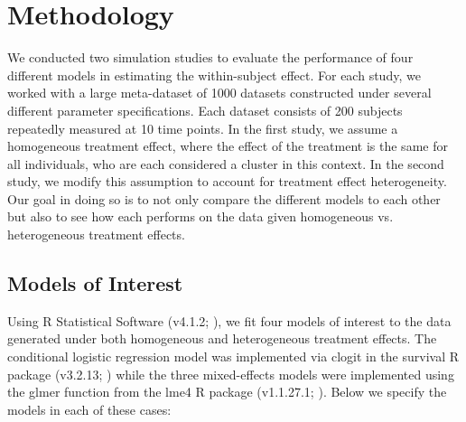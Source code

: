 \documentclass{article}
\begin{document}
    
\section{Methodology}
    We conducted two simulation studies to evaluate the performance of four different models in estimating the within-subject effect. For each study, we worked with a large meta-dataset of 1000 datasets constructed under several different parameter specifications. Each dataset consists of 200 subjects repeatedly measured at 10 time points. In the first study, we assume a homogeneous treatment effect, where the effect of the treatment is the same for all individuals, who are each considered a cluster in this context. In the second study, we modify this assumption to account for treatment effect heterogeneity. Our goal in doing so is to not only compare the different models to each other but also to see how each performs on the data given homogeneous vs. heterogeneous treatment effects. 
    
    \subsection{Models of Interest}
        Using R Statistical Software (v4.1.2; \citealt{r-main}), we fit four models of interest to the data generated under both homogeneous and heterogeneous treatment effects. The conditional logistic regression model was implemented via clogit in the survival R package (v3.2.13; \citealt{survival-package}) while the three mixed-effects models were implemented using the glmer function from the lme4 R package (v1.1.27.1; \citealt{lme4}). Below we specify the models in each of these cases:
        
\end{document}
